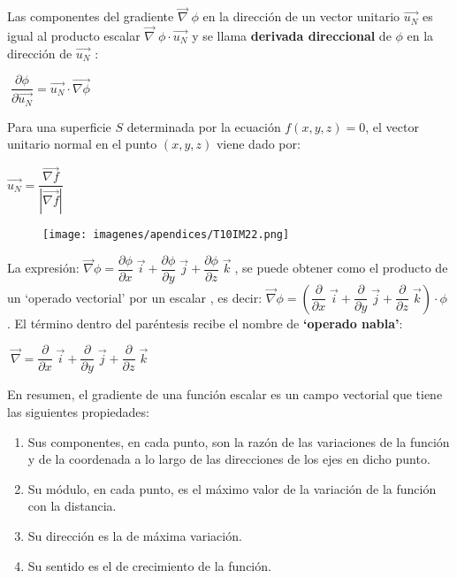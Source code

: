 Las componentes del gradiente $\overrightarrow {\nabla} \; \phi$ en la dirección de un vector unitario $\overrightarrow {u_N}$ es igual al producto escalar $\overrightarrow {\nabla} \; \phi \cdot \overrightarrow {u_N} $ y se llama \textbf{derivada direccional} de $\phi$ en la dirección de $\overrightarrow {u_N}$ :

\centerline {$\boxed{\; \dfrac {\partial \phi}{\partial \overrightarrow {u_N}} = \overrightarrow {u_N} \cdot \overrightarrow {\nabla \phi}  \; }$}

\begin{multicols}{2}
Para una superficie $S$ determinada por la ecuación $f(x,y,z)=0$, el vector unitario normal en el punto $(x,y,z)$ viene dado por:

\hspace{15mm} $\overrightarrow {u_N}= \dfrac {\overrightarrow {\nabla f}}{|\overrightarrow {\nabla f}|}$

	\begin{figure}[H]
	\centering
	\texttt{[image: imagenes/apendices/T10IM22.png]}
	\end{figure}
\end{multicols}

La expresión: $ \overrightarrow {\nabla} \phi = \dfrac {\partial \phi}{\partial x}\; \vec i +  \dfrac {\partial \phi}{\partial y}\; \vec j +  \dfrac {\partial \phi}{\partial z}\; \vec k\;$, se puede obtener como el producto de un `operado vectorial' por un escalar , es decir:
$ \overrightarrow {\nabla} \phi = \left( \dfrac {\partial }{\partial x}\; \vec i +  \dfrac {\partial }{\partial y}\; \vec j +  \dfrac {\partial }{\partial z}\; \vec k \right) \cdot \phi\;$.
 El término dentro del paréntesis recibe el nombre de \textbf{`operado nabla'}:

\vspace{4mm}

\centerline{ $\boxed{ \; \overrightarrow {\nabla}=  \dfrac {\partial }{\partial x}\; \vec i +  \dfrac {\partial }{\partial y}\; \vec j +  \dfrac {\partial }{\partial z}\; \vec k \; }$}

\vspace{3mm}En resumen, el gradiente de una función escalar es un campo vectorial que tiene las siguientes propiedades:

 \begin{enumerate}

\item Sus componentes, en cada punto, son la razón de las variaciones de la función y de la coordenada a lo largo de las direcciones de los ejes en dicho punto. 

\item Su módulo, en cada punto, es el máximo valor de la variación de la función con la distancia. 

\item Su dirección es la de máxima variación. 

\item Su sentido es el de crecimiento de la función.

 \end{enumerate}
 
